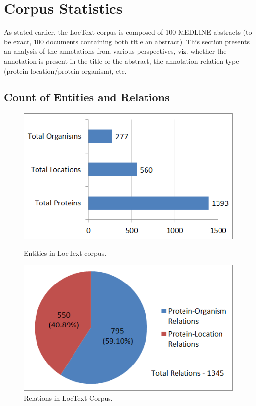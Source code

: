 \section{Corpus Statistics}\label{sec:corpusStats}


As stated earlier, the LocText corpus is composed of 100 MEDLINE abstracts (to be exact, 100 documents containing both title an abstract). This section presents an analysis of the annotations from various perspectives, viz. whether the annotation is present in the title or the abstract, the annotation relation type (protein-location/protein-organism), etc.

\subsection*{Count of Entities and Relations}

\begin{figure}
\centering
\begin{minipage}{.5\textwidth}
  \centering
  \includegraphics[width=.95\textwidth]{figures/ProtLocOrg_Distribution.png}
  \caption{Entities in LocText corpus.}
  \label{fig:LocText_Entities}
\end{minipage}%
\begin{minipage}{.5\textwidth}
  \centering
  \includegraphics[width=.95\textwidth]{figures/AllRelationsPie.png}
  \caption{Relations in LocText Corpus.}
  \label{fig:LocText_Relations}
\end{minipage}
\end{figure}

